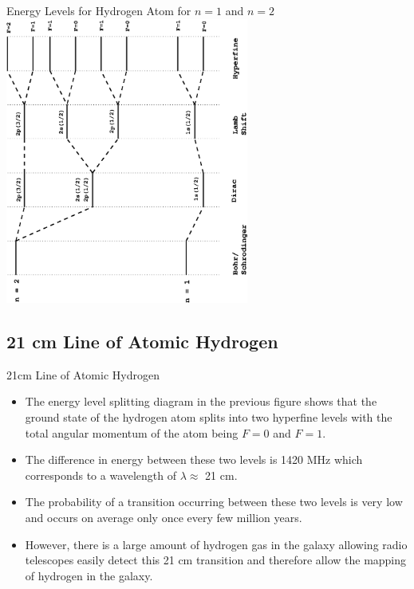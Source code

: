 \documentclass[aspectratio=1610,xcolor=dvipsnames,t]{beamer}
\begin{document}
    \begin{frame}{Energy Levels for Hydrogen Atom for $n=1$ and $n=2$} 
        \centering
        \includegraphics[angle=-90,width=0.6\textwidth]{all.eps}
    \end{frame} 


    \subsection{21 cm Line of Atomic Hydrogen}
    \begin{frame}{21cm Line of Atomic Hydrogen} 
        \begin{itemize} 
            \item The energy level splitting diagram in the previous figure shows that the ground state of
    the hydrogen atom splits into two hyperfine levels with the total angular
    momentum of the atom being $F=0$ and $F=1$.
\item The difference in energy between these two levels is 1420 MHz which corresponds
    to a wavelength of $\lambda \approx $ 21 cm. 
\item The probability of a transition occurring between these two levels is very low and occurs on average only 
    once every few million years. 
\item However, there is a large amount of hydrogen gas
    in the galaxy allowing radio telescopes easily detect this 21 cm transition and
    therefore allow the mapping of hydrogen in the galaxy.
        \end{itemize} 
    \end{frame} 
\end{document}
